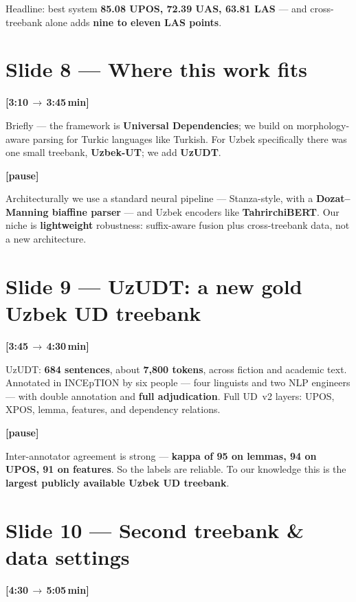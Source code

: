 \documentclass[12pt,a4paper]{article}
\newcommand{\timing}[2]{%
   \par\noindent\textbf{\small [#1\,$\to$\,#2\,min]}\par\vspace{0.2em}}
\newcommand{\say}[1]{\textbf{#1}}
\newcommand{\pause}{\par\vspace{0.4em}\textbf{[pause]}\par}
\begin{document}
\noindent
Headline: best system \say{85.08 UPOS, 72.39 UAS, 63.81 LAS} --- and
cross-treebank alone adds \textbf{nine to eleven LAS points}.

\section*{Slide 8 --- Where this work fits}
\timing{3:10}{3:45}

Briefly --- the framework is \textbf{Universal Dependencies}; we build on
morphology-aware parsing for Turkic languages like Turkish. For Uzbek
specifically there was one small treebank, \say{Uzbek-UT}; we add
\say{UzUDT}.

\pause

Architecturally we use a standard neural pipeline --- Stanza-style, with
a \textbf{Dozat--Manning biaffine parser} --- and Uzbek encoders like
\textbf{TahrirchiBERT}. Our niche is \say{lightweight} robustness:
suffix-aware fusion plus cross-treebank data, not a new architecture.

\section*{Slide 9 --- UzUDT: a new gold Uzbek UD treebank}
\timing{3:45}{4:30}

UzUDT: \textbf{684 sentences}, about \textbf{7,800 tokens}, across fiction
and academic text. Annotated in INCEpTION by six people --- four
linguists and two NLP engineers --- with double annotation and
\say{full adjudication}. Full UD~v2 layers: UPOS, XPOS, lemma, features,
and dependency relations.

\pause

Inter-annotator agreement is strong --- \textbf{kappa of 95 on lemmas, 94
on UPOS, 91 on features}. So the labels are reliable. To our knowledge
this is the \say{largest publicly available Uzbek UD treebank}.

\section*{Slide 10 --- Second treebank \& data settings}
\timing{4:30}{5:05}
\end{document}
